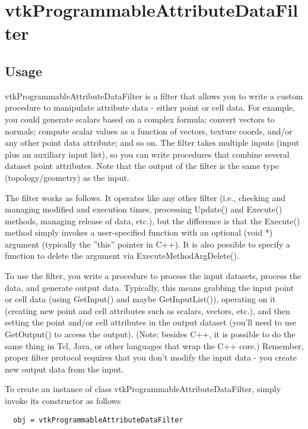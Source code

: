 \section{vtkProgrammableAttributeDataFilter}

\subsection{Usage}

 vtkProgrammableAttributeDataFilter is a filter that allows you to write a
 custom procedure to manipulate attribute data - either point or cell
 data. For example, you could generate scalars based on a complex formula;
 convert vectors to normals; compute scalar values as a function of
 vectors, texture coords, and/or any other point data attribute; and so
 on. The filter takes multiple inputs (input plus an auxiliary input list),
 so you can write procedures that combine several dataset point
 attributes. Note that the output of the filter is the same type
 (topology/geometry) as the input.

 The filter works as follows. It operates like any other filter (i.e.,
 checking and managing modified and execution times, processing Update()
 and Execute() methods, managing release of data, etc.), but the difference
 is that the Execute() method simply invokes a user-specified function with
 an optional (void *) argument (typically the ''this'' pointer in C++). It is
 also possible to specify a function to delete the argument via
 ExecuteMethodArgDelete().

 To use the filter, you write a procedure to process the input datasets,
 process the data, and generate output data. Typically, this means grabbing
 the input point or cell data (using GetInput() and maybe GetInputList()),
 operating on it (creating new point and cell attributes such as scalars,
 vectors, etc.), and then setting the point and/or cell attributes in the
 output dataset (you'll need to use GetOutput() to access the output).
 (Note: besides C++, it is possible to do the same thing in Tcl, Java, or
 other languages that wrap the C++ core.) Remember, proper filter protocol
 requires that you don't modify the input data - you create new output data
 from the input.


To create an instance of class vtkProgrammableAttributeDataFilter, simply
invoke its constructor as follows
\begin{verbatim}
  obj = vtkProgrammableAttributeDataFilter
\end{verbatim}
